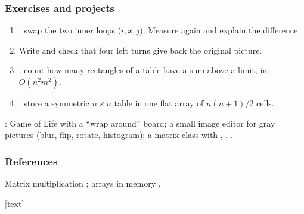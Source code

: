 \documentclass[aspectratio=169,10pt,compress]{beamer}
\begin{document}
\begin{frame}[t,fragile] \frametitle{Exercises and projects}
	\begin{enumerate}\small
		\item {}: swap the two inner loops ($i, x, j$). Measure again and explain the difference.
		\item Write  and check that four left turns give back the original picture.
		\item {}: count how many rectangles of a table have a sum above a limit, in $O(n^{2} m^{2})$.
		\item {}: store a symmetric $n \times n$ table in one flat array of $n(n+1)/2$ cells.
	\end{enumerate}

	\vspace{0.5em}
	: Game of Life with a ``wrap around'' board; a small image editor for  gray
	pictures (blur, flip, rotate, histogram); a matrix class with , , .
\end{frame}




\begin{frame}[t,fragile] \frametitle{References}
	\small Matrix multiplication \cite{cormen2022introduction}; arrays in memory \cite{knuth1973artv1}.

	\vspace{1em}
	[text]
	
	\tiny
\end{frame}




\begin{frame}[t,fragile]
	\begin{center}
		\vspace{4cm}
	\end{center}
\end{frame}
\end{document}
